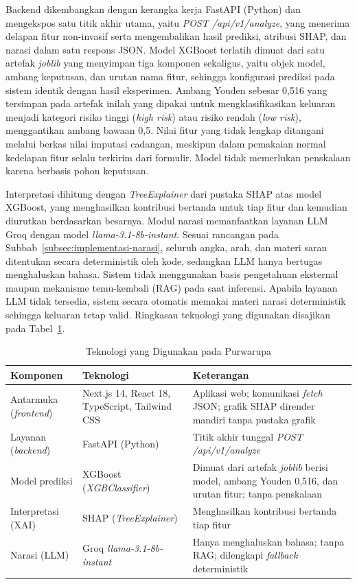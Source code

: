 Backend dikembangkan dengan kerangka kerja FastAPI (Python) dan mengekspos satu titik akhir utama, yaitu \textit{POST /api/v1/analyze}, yang menerima delapan fitur non-invasif serta mengembalikan hasil prediksi, atribusi SHAP, dan narasi dalam satu respons JSON. Model XGBoost terlatih dimuat dari satu artefak \textit{joblib} yang menyimpan tiga komponen sekaligus, yaitu objek model, ambang keputusan, dan urutan nama fitur, sehingga konfigurasi prediksi pada sistem identik dengan hasil eksperimen. Ambang Youden sebesar 0,516 yang tersimpan pada artefak inilah yang dipakai untuk mengklasifikasikan keluaran menjadi kategori risiko tinggi (\emph{high risk}) atau risiko rendah (\emph{low risk}), menggantikan ambang bawaan 0,5. Nilai fitur yang tidak lengkap ditangani melalui berkas nilai imputasi cadangan, meskipun dalam pemakaian normal kedelapan fitur selalu terkirim dari formulir. Model tidak memerlukan penskalaan karena berbasis pohon keputusan.

Interpretasi dihitung dengan \textit{TreeExplainer} dari pustaka SHAP atas model XGBoost, yang menghasilkan kontribusi bertanda untuk tiap fitur dan kemudian diurutkan berdasarkan besarnya. Modul narasi memanfaatkan layanan LLM Groq dengan model \textit{llama-3.1-8b-instant}. Sesuai rancangan pada Subbab~\ref{subsec:implementasi-narasi}, seluruh angka, arah, dan materi saran ditentukan secara deterministik oleh kode, sedangkan LLM hanya bertugas menghaluskan bahasa. Sistem tidak menggunakan basis pengetahuan eksternal maupun mekanisme temu-kembali (RAG) pada saat inferensi. Apabila layanan LLM tidak tersedia, sistem secara otomatis memakai materi narasi deterministik sehingga keluaran tetap valid. Ringkasan teknologi yang digunakan disajikan pada Tabel~\ref{tab:teknologi-prototype}.

\begin{table}[htbp]
    \centering
    \caption{Teknologi yang Digunakan pada Purwarupa}
    \label{tab:teknologi-prototype}
    \small
    \centering
    \begin{tabular}{|p{3.5cm}|p{5cm}|p{6cm}|}
        \hline
        \textbf{Komponen} & \textbf{Teknologi} & \textbf{Keterangan} \\
        \hline
        Antarmuka (\emph{frontend}) & Next.js 14, React 18, TypeScript, Tailwind CSS & Aplikasi web; komunikasi \textit{fetch} JSON; grafik SHAP dirender mandiri tanpa pustaka grafik \\
        \hline
        Layanan (\emph{backend}) & FastAPI (Python) & Titik akhir tunggal \textit{POST /api/v1/analyze} \\
        \hline
        Model prediksi & XGBoost (\textit{XGBClassifier}) & Dimuat dari artefak \textit{joblib} berisi model, ambang Youden 0,516, dan urutan fitur; tanpa penskalaan \\
        \hline
        Interpretasi (XAI) & SHAP (\textit{TreeExplainer}) & Menghasilkan kontribusi bertanda tiap fitur \\
        \hline
        Narasi (LLM) & Groq \textit{llama-3.1-8b-instant} & Hanya menghaluskan bahasa; tanpa RAG; dilengkapi \emph{fallback} deterministik \\
        \hline
    \end{tabular}
\end{table}

